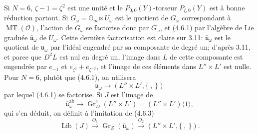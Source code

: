 \documentclass[10pt,a4paper]{article}
\newcommand{\Gm}{\mathbb G_m}
\newcommand{\MT}{\operatorname{MT}}
\newcommand{\Gr}{\operatorname{Gr}}
\newcommand{\OO}{\mathcal O}
\newcommand{\uomega}{\mathfrak u_\omega}
\theoremstyle{deligne}
\newcommand{\heading}[1]{\vspace{0.65em}\noindent{\bfseries #1}\quad}
\begin{document}
\heading{4.7.} Si \(N=6\), \(\zeta-1=\zeta^2\) est une unité et le \(P_{0,0}(Y)\)-torseur \(P_{\zeta,0}(Y)\) est à bonne réduction partout. Si \(G_\omega=\Gm\ltimes U_\omega\) est le quotient de \(G_\omega\) correspondant à \(\MT(\OO)\), l'action de \(G_\omega\) se factorise donc par \(\overline G_\omega\), et (4.6.1) par l'algèbre de Lie graduée \(\overline{\mathfrak u}_\omega\) de \(\overline U_\omega\). Cette dernière factorisation est claire sur 3.11: \(\overline{\mathfrak u}_\omega\) est le quotient de \(\uomega\) par l'idéal engendré par sa composante de degré un; d'après 3.11, et parce que \(D^2L\) est nul en degré un, l'image dans \(L\) de cette composante est engendrée par \(e_{-1}\) et \(e_{\zeta^2}+e_{\zeta^{-2}}\), et l'image de ces éléments dans \(L''\times L'\) est nulle. Pour \(N=6\), plutôt que (4.6.1), on utilisera
\[
\tag{4.7.1}
\overline{\mathfrak u}_\omega\longrightarrow(L''\times L',\{\ ,\ \})
\]
par lequel (4.6.1) se factorise. Si \(J\) est l'image de
\[
\tag{4.7.2}
\overline{\mathfrak u}_\omega^{\mathrm{ab}}\longrightarrow\Gr_D^1(L''\times L')=(L''\times L')\langle1\rangle,
\]
qui s'en déduit, on définit à l'imitation de (4.6.3)
\[
\tag{4.7.3}
\operatorname{Lib}(J)\overset{O_1}{\longrightarrow}\Gr_Z(\overline{\mathfrak u}_\omega)
\overset{O_2}{\longrightarrow}(L''\times L',\{\ ,\ \}).
\]
\end{document}
